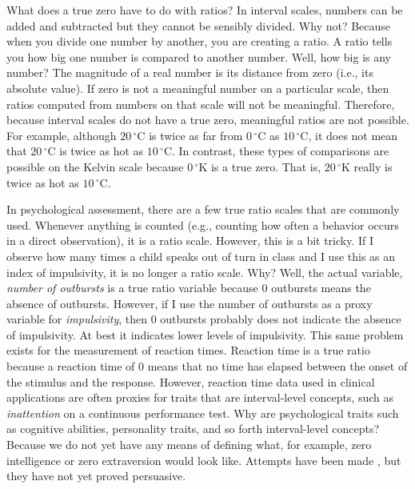 \documentclass[nohyper,justified,marginals=raggedright]{tufte-book}\usepackage[]{graphicx}\usepackage[]{color}
\begin{document}
What does a true zero have to do with ratios? In interval scales, numbers can be added and subtracted but they cannot be sensibly divided. Why not? Because when you divide one number by another, you are creating a ratio. A ratio tells you how big one number is compared to another number. Well, how big is any number? The magnitude of a real number is its distance from zero (i.e., its absolute value). If zero is not a meaningful number on a particular scale, then ratios computed from numbers on that scale will not be meaningful. Therefore, because interval scales do not have a true zero, meaningful ratios are not possible. For example, although $20\,^{\circ}\mathrm{C}$ is twice as far from $0\,^{\circ}\mathrm{C}$ as $10\,^{\circ}\mathrm{C}$, it does not mean that $20\,^{\circ}\mathrm{C}$ is twice as hot as $10\,^{\circ}\mathrm{C}$. In contrast, these types of comparisons are possible on the Kelvin scale because $0\,^{\circ}\mathrm{K}$ is a true zero. That is, $20\,^{\circ}\mathrm{K}$ really is twice as hot as $10\,^{\circ}\mathrm{C}$.

In psychological assessment, there are a few true ratio scales that are commonly used. Whenever anything is counted (e.g., counting how often a behavior occurs in a direct observation), it is a ratio scale. However, this is a bit tricky. If I observe how many times a child speaks out of turn in class and I use this as an index of impulsivity, it is no longer a ratio scale. Why? Well, the actual variable, \emph{number of outbursts} is a true ratio variable because 0 outbursts means the absence of outbursts. However, if I use the number of outbursts as a proxy variable for \emph{impulsivity}, then 0 outbursts probably does not indicate the absence of impulsivity. At best it indicates lower levels of impulsivity. This same problem exists for the measurement of reaction times. Reaction time is a true ratio because a reaction time of 0 means that no time has elapsed between the onset of the stimulus and the response. However, reaction time data used in clinical applications are often proxies for traits that are interval-level concepts, such as \emph{inattention} on a continuous performance test. Why are psychological traits such as cognitive abilities, personality traits, and so forth interval-level concepts? Because we do not yet have any means of defining what, for example, zero intelligence or zero extraversion would look like. Attempts have been made \citep{jensen2006clocking}, but they have not yet proved persuasive.
\end{document}
